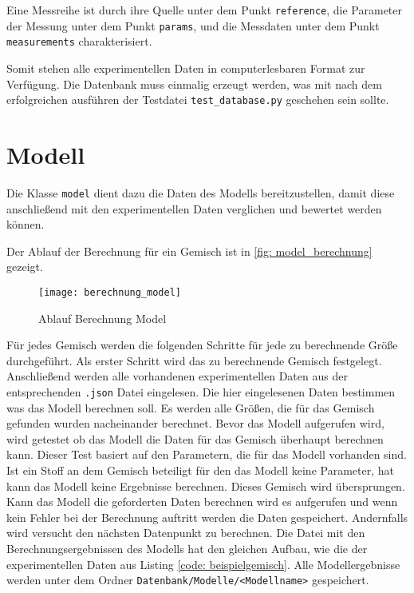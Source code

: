 \documentclass[../thesis.tex]{subfiles}
\begin{document}
Eine Messreihe ist durch ihre Quelle unter dem Punkt \texttt{reference}, die Parameter der Messung unter dem Punkt \texttt{params}, und die Messdaten unter dem Punkt \texttt{measurements} charakterisiert.

Somit stehen alle experimentellen Daten in computerlesbaren Format zur Verfügung. Die Datenbank muss einmalig erzeugt werden, was mit nach dem erfolgreichen ausführen der Testdatei \texttt{test\_database.py} geschehen sein sollte.

\section{Modell}

Die Klasse \texttt{model} dient dazu die Daten des Modells bereitzustellen, damit diese anschließend mit den experimentellen Daten verglichen und bewertet werden können.

Der Ablauf der Berechnung für ein Gemisch ist in \autoref{fig: model_berechnung} gezeigt.

\begin{figure}[htb]
	\centering
	\texttt{[image: berechnung\_model]}
	\caption{Ablauf Berechnung Model}
	\label{fig: model_berechnung}
\end{figure}

Für jedes Gemisch werden die folgenden Schritte für jede zu berechnende Größe durchgeführt. Als erster Schritt wird das zu berechnende Gemisch festgelegt. Anschließend werden alle vorhandenen experimentellen Daten aus der entsprechenden \texttt{.json} Datei eingelesen. Die hier eingelesenen Daten bestimmen was das Modell berechnen soll. Es werden alle Größen, die für das Gemisch gefunden wurden nacheinander berechnet. Bevor das Modell aufgerufen wird, wird getestet ob das Modell die Daten für das Gemisch überhaupt berechnen kann. Dieser Test basiert auf den Parametern, die für das Modell vorhanden sind. Ist ein Stoff an dem Gemisch beteiligt für den das Modell keine Parameter, hat kann das Modell keine Ergebnisse berechnen. Dieses Gemisch wird übersprungen.
Kann das Modell die geforderten Daten berechnen wird es aufgerufen und wenn kein Fehler bei der Berechnung auftritt werden die Daten gespeichert. Andernfalls wird versucht den nächsten Datenpunkt zu berechnen. Die Datei mit den Berechnungsergebnissen des Modells hat den gleichen Aufbau, wie die der experimentellen Daten aus Listing \autoref{code: beispielgemisch}. Alle Modellergebnisse werden unter dem Ordner \texttt{Datenbank/Modelle/<Modellname>} gespeichert.
\end{document}
